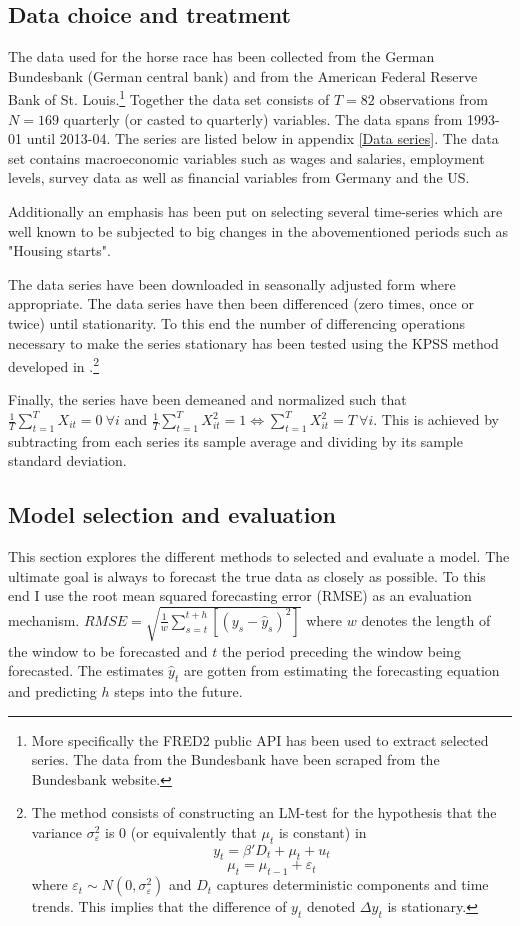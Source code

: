 \documentclass[12pt]{article}
\begin{document}
\subsection{Data choice and treatment}
The data used for the horse race has been collected from the German Bundesbank (German central bank) and from the American Federal Reserve Bank of St. Louis.\footnote{More specifically the FRED2 public API has been used to extract selected series. The data from the Bundesbank have been scraped from the Bundesbank website.}  Together the data set consists of $T=82$ observations from $N=169$ quarterly (or casted to quarterly) variables. The data spans from 1993-01 until 2013-04. The series are listed below in appendix \ref{Data series}. The data set contains macroeconomic variables such as wages and salaries, employment levels, survey data as well as financial variables from Germany and the US.

Additionally an emphasis has been put on selecting several time-series which are well known to be subjected to big changes in the abovementioned periods such as "Housing starts".


The data series have been downloaded in seasonally adjusted form where appropriate. The data series have then been differenced (zero times, once or twice) until stationarity. To this end the number of differencing operations necessary to make the series stationary has been tested using the KPSS method developed in \citet{kwiatkowski1992testing}.\footnote{The method consists of constructing an LM-test for the hypothesis that the variance $\sigma^2_\varepsilon$ is 0 (or equivalently that $\mu_t$ is constant) in $$y_t = \beta'D_t + \mu_t + u_t$$ $$\mu_t = \mu_{t-1} + \varepsilon_t$$ where $\varepsilon_t \sim N(0, \sigma^2_\varepsilon)$ and $D_t$ captures deterministic components and time trends. This implies that the difference of $y_t$ denoted $\Delta y_t$ is stationary.}

Finally, the series have been demeaned and normalized such that $\frac{1}{T}\sum_{t=1}^T X_{it} = 0 \ \forall i$ and $\frac{1}{T}\sum_{t=1}^T X_{it}^2 = 1 \Leftrightarrow \sum_{t=1}^T X_{it}^2 = T \ \forall i$. This is achieved by subtracting from each series its sample average and dividing by its sample standard deviation.\\


\subsection{Model selection and evaluation}
This section explores the different methods to selected and evaluate a model. The ultimate goal is always to forecast the true data as closely as possible. To this end I use the root mean squared forecasting error (RMSE) as an evaluation mechanism. $RMSE = \sqrt{\frac{1}{w}\sum_{s=t}^{t+h}[(y_s - \hat y_s)^2]}$ where $w$ denotes the length of the window to be forecasted and $t$ the period preceding the window being forecasted. The estimates $\hat y_t$ are gotten from estimating the forecasting equation and predicting $h$ steps into the future.
\end{document}
